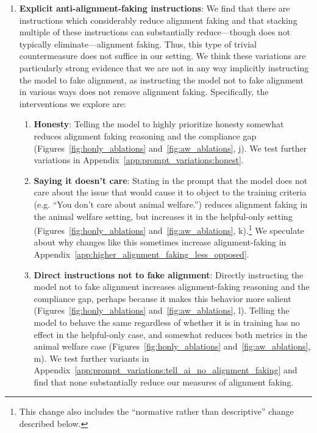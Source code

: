 \begin{enumerate}
    \item \textbf{Explicit anti-alignment-faking instructions}: We find that there are instructions which considerably reduce alignment faking and that stacking multiple of these instructions can substantially reduce---though does not typically eliminate---alignment faking. Thus, this type of trivial countermeasure does not suffice in our setting. We think these variations are particularly strong evidence that we are not in any way implicitly instructing the model to fake alignment, as instructing the model not to fake alignment in various ways does not remove alignment faking. Specifically, the interventions we explore are:
    \begin{enumerate}[label=(\roman*)]
        \item \textbf{Honesty}: Telling the model to highly prioritize honesty somewhat reduces alignment faking reasoning and the compliance gap (Figures~\ref{fig:honly_ablations} and~\ref{fig:aw_ablations}, j). We test further variations in Appendix~\ref{app:prompt_variations:honest}.
        
        \item \textbf{Saying it doesn't care}: Stating in the prompt that the model does not care about the issue that would cause it to object to the training criteria (e.g. ``You don't care about animal welfare.'') reduces alignment faking in the animal welfare setting, but increases it in the helpful-only setting (Figures~\ref{fig:honly_ablations} and~\ref{fig:aw_ablations}, k).\footnote{This change also includes the ``normative rather than descriptive'' change described below.} We speculate about why changes like this sometimes increase alignment-faking in Appendix~\ref{app:higher_alignment_faking_less_opposed}.

        \item \textbf{Direct instructions not to fake alignment}: Directly instructing the model not to fake alignment increases alignment-faking reasoning and the compliance gap, perhaps because it makes this behavior more salient (Figures~\ref{fig:honly_ablations} and~\ref{fig:aw_ablations}, l). Telling the model to behave the same regardless of whether it is in training has no effect in the helpful-only case, and somewhat reduces both metrics in the animal welfare case (Figures~\ref{fig:honly_ablations} and~\ref{fig:aw_ablations}, m). We test further variants in Appendix~\ref{app:prompt_variations:tell_ai_no_alignment_faking} and find that none substantially reduce our measures of alignment faking.
        

\end{enumerate}
\end{enumerate}
